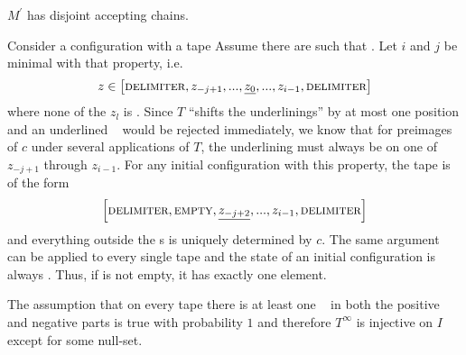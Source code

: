 \begin{Lemma}
	\label{tm_to_tds:properties:lemma_disjoint_accepting_chains}
	$M^\prime$ has disjoint accepting chains.
\end{Lemma}
\proof
Consider a configuration  with a tape 
Assume there are  such that .
Let $i$ and $j$ be minimal with that property, i.e.
\begin{align*}
	z \in \left [ \text{\scshape{delimiter}} , z_{-j+1} , ... , \underline{z_0} , ... , z_{i-1} , \text{\scshape{delimiter}} \right ]
\end{align*}
where none of the $z_l$ is \DELIM.
Since $T$ ``shifts the underlinings'' by at most one position and an underlined \DELIM~ would be rejected immediately, we know that for preimages of $c$ under several applications of $T$, the underlining must always be on one of $z_{-j+1}$ through $z_{i-1}$. For any initial configuration with this property, the tape is of the form
\begin{align*}
	\left [ \text{\scshape{delimiter}} , \text{\scshape{empty}} , \underline{z_{-j+2}} , ... , z_{i-1} , \text{\scshape{delimiter}} \right ]
\end{align*}
and everything outside the \DELIM s is uniquely determined by $c$.
The same argument can be applied to every single tape and the state of an initial configuration is always \INI.
Thus, if  is not empty, it has exactly one element.

The assumption that on every tape there is at least one \DELIM~ in both the positive and negative parts is true with probability $1$ and therefore $T^\infty$ is injective on $I$ except for some null-set.
\endproof
